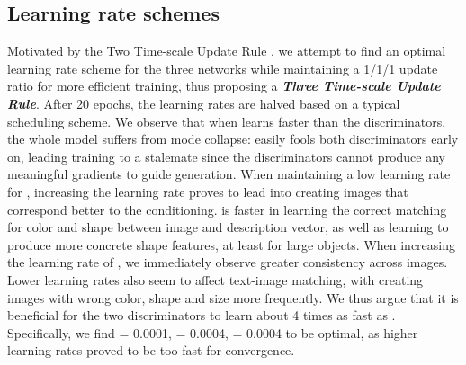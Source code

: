 \documentclass{article}
\begin{document}
\subsection{Learning rate schemes}
Motivated by the Two Time-scale Update Rule \cite{heusel2018ttur}, we attempt to find an optimal learning rate scheme for the three networks while maintaining a 1/1/1 update ratio for more efficient training, thus proposing a \textbf{\textit{Three Time-scale Update Rule}}. 
After 20 epochs, the learning rates are halved based on a typical scheduling scheme.  We observe that when  learns faster than the discriminators, the whole model suffers from mode
collapse:  easily fools both discriminators early on, leading training to a stalemate since the
discriminators cannot produce any meaningful gradients to guide generation. When maintaining a low learning rate for , increasing the  learning rate proves to lead  into creating images that correspond better to the conditioning.  is faster in learning the correct matching for color and shape between image and description
vector, as well as learning to produce more concrete shape features, at least for large objects.
When increasing the learning rate of , we immediately observe greater consistency across
images. 
Lower learning rates also seem to affect text-image matching, with
 creating images with wrong color, shape and size more frequently.
We thus argue that it is beneficial for the two discriminators to learn about 4 times as fast as
. Specifically, we find  = 0.0001,  = 0.0004,  = 0.0004 to be optimal, as higher learning rates proved to be too fast for convergence. 
\end{document}
